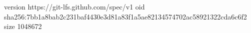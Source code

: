 version https://git-lfs.github.com/spec/v1
oid sha256:7bb1a8bab2c231baf4430e3d81a83f1a5ae82134574702ac58921322cda6c6f2
size 1048672
